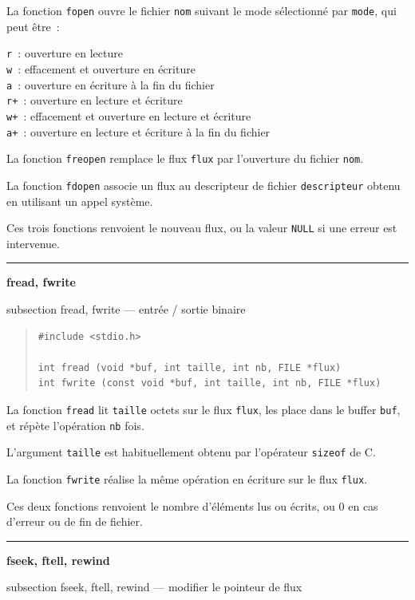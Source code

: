 \documentclass [twoside] {report}
\newcommand {\primitive} [1]
    {
	\phantomsection
	{\large \textbf {#1}}
	\addcontentsline {toc} {subsection} {#1}
    }
\newcommand {\separation}
    {
	\vspace {5mm}
	\nopagebreak
	\hrule
    }
\begin{document}
La fonction \texttt {fopen} ouvre le fichier \texttt {nom} suivant le
mode sélectionné par \texttt {mode}, qui peut être~: \par
\texttt {r  }: ouverture en lecture \\
\texttt {w  }: effacement et ouverture en écriture \\
\texttt {a  }: ouverture en écriture à la fin du fichier \\
\texttt {r+ }: ouverture en lecture et écriture \\
\texttt {w+ }: effacement et ouverture en lecture et écriture \\
\texttt {a+ }: ouverture en lecture et écriture à la fin du fichier 

La fonction \texttt {freopen} remplace le flux \texttt {flux} par
l'ouverture du fichier \texttt {nom}.

La fonction \texttt {fdopen} associe un flux au descripteur de
fichier \texttt {descripteur} obtenu en utilisant un appel
système.

Ces trois fonctions renvoient le nouveau flux, ou la valeur
\texttt {NULL} si une erreur est intervenue.



\separation
\primitive {fread, fwrite} --- entrée / sortie binaire

\begin {quote}
\begin {verbatim}
#include <stdio.h>

int fread (void *buf, int taille, int nb, FILE *flux)
int fwrite (const void *buf, int taille, int nb, FILE *flux)
\end{verbatim}
\end {quote}

La fonction \texttt {fread} lit \texttt {taille} octets sur le flux
\texttt {flux}, les place dans le buffer \texttt {buf}, et répète
l'opération \texttt {nb} fois.

L'argument \texttt {taille} est habituellement obtenu par
l'opérateur \texttt {sizeof} de C.

La fonction \texttt {fwrite} réalise la même opération en écriture
sur le flux \texttt {flux}.

Ces deux fonctions renvoient le nombre d'éléments lus ou
écrits, ou 0 en cas d'erreur ou de fin de fichier.



\separation
\primitive {fseek, ftell, rewind} --- modifier le pointeur de flux
\end{document}
